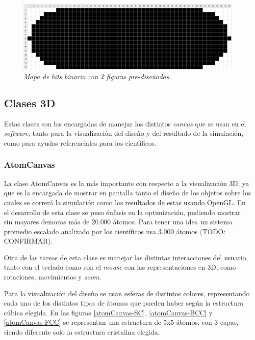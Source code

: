 \begin{figure}[ht]
  \centering
  \includegraphics[scale=.25]{images/elipsoide}
  \caption{\em Mapa de bits binario con 2 figuras pre-diseñadas.}
  \label{elipsoide}
\end{figure}

\subsection{Clases 3D}

Estas clases son las encargadas de manejar los distintos \emph{canvas} que se usan en el \emph{software}, tanto para la visualización del diseño y del resultado de la simulación, como para ayudas referenciales para los científicos.

\subsubsection{AtomCanvas}

La clase AtomCanvas es la más importante con respecto a la visualización 3D, ya que es la encargada de mostrar en pantalla tanto el diseño de los objetos sobre los cuales se correrá la simulación como los resultados de estas usando OpenGL. En el desarrollo de esta clase se puso énfasis en la optimización, pudiendo mostrar sin mayores demoras más de 20.000 átomos. Para tener una idea un sistema promedio escalado analizado por los científicos usa 3.000 átomos (TODO: CONFIRMAR).

Otra de las tareas de esta clase es manejar las distintas interacciones del usuario, tanto con el teclado como con el \emph{mouse} con las representaciones en 3D, como rotaciones, movimientos y \emph{zoom}.

Para la visualización del diseño se usan esferas de distintos colores, representando cada uno de los distintos tipos de átomos que pueden haber según la estructura cúbica elegida. En las figuras \ref{atomCanvas-SC}, \ref{atomCanvas-BCC} y \ref{atomCanvas-FCC} se representan una estructura de 5x5 átomos, con 3 capas, siendo diferente solo la estructura cristalina elegida.

